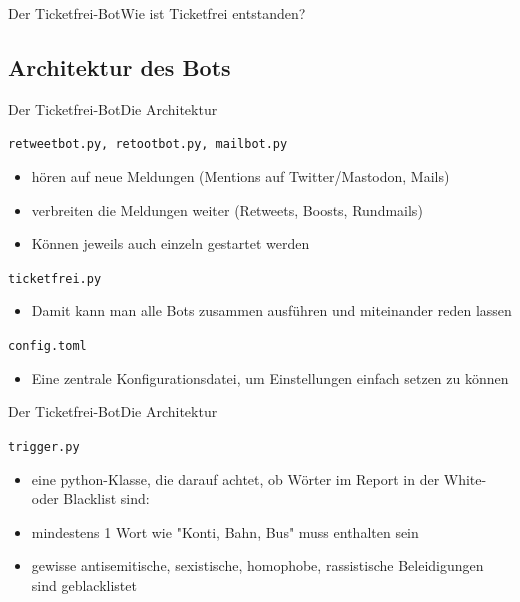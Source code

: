 \documentclass[10pt]{beamer}
\begin{document}
{\begin{frame}{Der Ticketfrei-Bot}{Wie ist Ticketfrei entstanden?}
\end{frame}

\subsection{Architektur des Bots}
\begin{frame}{Der Ticketfrei-Bot}{Die Architektur}

\begin{block}{{\tt retweetbot.py, retootbot.py, mailbot.py}}
  \begin{itemize}
    \item hören auf neue Meldungen (Mentions auf Twitter/Mastodon, Mails)
    \item verbreiten die Meldungen weiter (Retweets, Boosts, Rundmails)
    \item Können jeweils auch einzeln gestartet werden
  \end{itemize}
\end{block}

\begin{block}{{\tt ticketfrei.py}}
  \begin{itemize}
    \item Damit kann man alle Bots zusammen ausführen und miteinander reden lassen
  \end{itemize}
\end{block}

\begin{block}{{\tt config.toml}}
  \begin{itemize}
    \item Eine zentrale Konfigurationsdatei, um Einstellungen einfach setzen zu können
  \end{itemize}
\end{block}

\end{frame}
\begin{frame}{Der Ticketfrei-Bot}{Die Architektur}

\begin{block}{{\tt trigger.py}}
  \begin{itemize}
    \item eine python-Klasse, die darauf achtet, ob Wörter im Report in der White- oder Blacklist sind:
    \item mindestens 1 Wort wie "Konti, Bahn, Bus" muss enthalten sein
    \item gewisse antisemitische, sexistische, homophobe, rassistische Beleidigungen sind geblacklistet
  \end{itemize}
\end{block}


\end{frame}}
\end{document}

